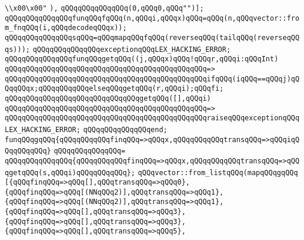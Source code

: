 \verb|\\x00\x00"|\newline
\verb|),|\newline
\verb|qQQqqQQqqQQqqQQq(0,qQQq0,qQQq"")];|\newline
\verb|qQQqqQQqqQQqqQQqfunqQQqfqQQq(n,qQQqi,qQQqx)qQQq=qQQq(n,qQQqvector::from_fnqQQq(i,qQQqdecodeqQQqx));|\newline
\verb|qQQqqQQqqQQqqQQqsqQQq=qQQqmapqQQqfqQQq(reverseqQQq(tailqQQq(reverseqQQqs)));|\newline
\verb|qQQqqQQqqQQqqQQqexceptionqQQqLEX_HACKING_ERROR;|\newline
\verb|qQQqqQQqqQQqqQQqfunqQQqgetqQQq((j,qQQqx)qQQq!qQQqr,qQQqi:qQQqInt)|\newline
\verb|qQQqqQQqqQQqqQQqqQQqqQQqqQQqqQQqqQQqqQQqqQQqqQQq=>|\newline
\verb|qQQqqQQqqQQqqQQqqQQqqQQqqQQqqQQqqQQqqQQqqQQqqQQqifqQQq(iqQQq==qQQqj)qQQqqQQqx;qQQqqQQqqQQqelseqQQqgetqQQq(r,qQQqi);qQQqfi;|\newline
\newline
\verb|qQQqqQQqqQQqqQQqqQQqqQQqqQQqqQQqgetqQQq([],qQQqi)|\newline
\verb|qQQqqQQqqQQqqQQqqQQqqQQqqQQqqQQqqQQqqQQqqQQqqQQq=>|\newline
\verb|qQQqqQQqqQQqqQQqqQQqqQQqqQQqqQQqqQQqqQQqqQQqqQQqraiseqQQqexceptionqQQqLEX_HACKING_ERROR;|\newline
\verb|qQQqqQQqqQQqqQQqend;|\newline
\verb|funqQQqgqQQq{qQQqqQQqqQQqfinqQQq=>qQQqx,qQQqqQQqqQQqtransqQQq=>qQQqiqQQqqQQqqQQq}|\newline
\verb|qQQqqQQqqQQqqQQq=|\newline
\verb|qQQqqQQqqQQqqQQq{qQQqqQQqqQQqfinqQQq=>qQQqx,qQQqqQQqqQQqtransqQQq=>qQQqgetqQQq(s,qQQqi)qQQqqQQqqQQq};|\newline
\verb|qQQqvector::from_listqQQq(mapqQQqgqQQq|\newline
\verb|[{qQQqfinqQQq=>qQQq[],qQQqtransqQQq=>qQQq0},|\newline
\verb|{qQQqfinqQQq=>qQQq[(NNqQQq2)],qQQqtransqQQq=>qQQq1},|\newline
\verb|{qQQqfinqQQq=>qQQq[(NNqQQq2)],qQQqtransqQQq=>qQQq1},|\newline
\verb|{qQQqfinqQQq=>qQQq[],qQQqtransqQQq=>qQQq3},|\newline
\verb|{qQQqfinqQQq=>qQQq[],qQQqtransqQQq=>qQQq3},|\newline
\verb|{qQQqfinqQQq=>qQQq[],qQQqtransqQQq=>qQQq5},|\newline
